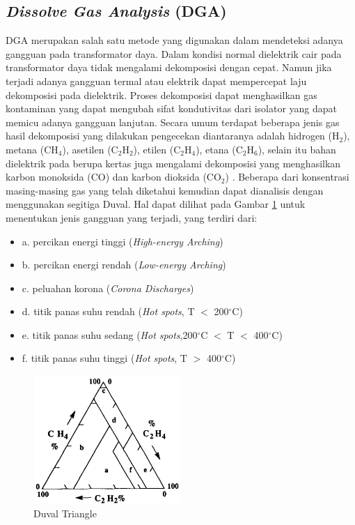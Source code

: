 \subsection{\textit{Dissolve Gas Analysis} (DGA)}
DGA merupakan salah satu metode yang digunakan dalam mendeteksi adanya gangguan pada transformator daya. Dalam kondisi normal dielektrik cair pada transformator daya tidak mengalami dekomposisi dengan cepat. Namun jika terjadi adanya gangguan termal atau elektrik dapat mempercepat laju dekomposisi pada dielektrik. Proses dekomposisi dapat menghasilkan gas kontaminan yang dapat mengubah sifat kondutivitas dari isolator yang dapat memicu adanya gangguan lanjutan. Secara umum terdapat beberapa jenis gas hasil dekomposisi yang dilakukan pengecekan diantaranya adalah hidrogen (H$_2$), metana (CH$_4$), asetilen (C$_2$H$_2$), etilen (C$_2$H$_4$), etana (C$_2$H$_6$), selain itu bahan dielektrik pada berupa kertas juga mengalami dekomposisi yang menghasilkan karbon monoksida (CO) dan karbon dioksida (CO$_2$) \cite{ahmed2013power}. Beberapa dari konsentrasi masing-masing gas yang telah diketahui kemudian dapat dianalisis dengan menggunakan segitiga Duval\cite{duval1989dissolved}. Hal dapat dilihat pada Gambar \ref{gambar:duval triangle} untuk menentukan jenis gangguan yang terjadi, yang terdiri dari:

\begin{itemize}
	\item[] a. percikan energi tinggi (\textit{High-energy Arching})
	\item[] b. percikan energi rendah (\textit{Low-energy Arching})
	\item[] c. peluahan korona (\textit{Corona Discharges})
	\item[] d. titik panas suhu rendah (\textit{Hot spots}, T $<$ 200$^{\circ}$C)
	\item[] e. titik panas suhu sedang (\textit{Hot spots},200$^{\circ}$C $<$ T $<$ 400$^{\circ}$C)
	\item[] f. titik panas suhu tinggi (\textit{Hot spots}, T $>$ 400$^{\circ}$C)
\end{itemize}

\begin{figure}[h]
	\begin{center}
    \includegraphics[width=0.5\textwidth]{BAB-2/figures/duval triangle.png}	
	    \caption{Duval Triangle \cite{duval1989dissolved}}
	    \label{gambar:duval triangle}
	\end{center}
\end{figure}

